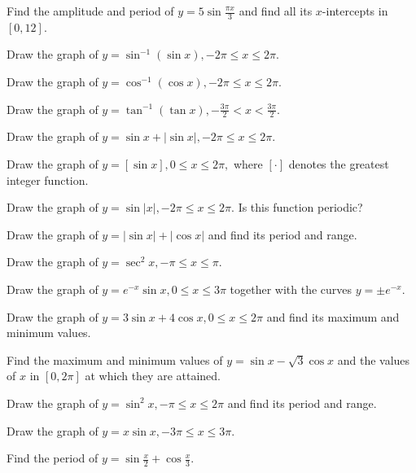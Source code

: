 \item Find the amplitude and period of $y = 5\sin\frac{\pi x}{3}$ and find all its $x$-intercepts in $[0, 12].$

\item Draw the graph of $y = \sin^{-1}(\sin x), -2\pi\leq x\leq 2\pi.$

\item Draw the graph of $y = \cos^{-1}(\cos x), -2\pi\leq x\leq 2\pi.$

\item Draw the graph of $y = \tan^{-1}(\tan x), -\frac{3\pi}{2} < x < \frac{3\pi}{2}.$

\item Draw the graph of $y = \sin x + |\sin x|, -2\pi\leq x\leq 2\pi.$

\item Draw the graph of $y = [\sin x], 0\leq x\leq 2\pi,$ where $[\cdot]$ denotes the greatest integer function.

\item Draw the graph of $y = \sin|x|, -2\pi\leq x\leq 2\pi.$ Is this function periodic?

\item Draw the graph of $y = |\sin x| + |\cos x|$ and find its period and range.

\item Draw the graph of $y = \sec^2x, -\pi\leq x\leq \pi.$

\item Draw the graph of $y = e^{-x}\sin x, 0\leq x\leq 3\pi$ together with the curves $y = \pm e^{-x}.$

\item Draw the graph of $y = 3\sin x + 4\cos x, 0\leq x\leq 2\pi$ and find its maximum and minimum values.

\item Find the maximum and minimum values of $y = \sin x - \sqrt{3}\cos x$ and the values of $x$ in $[0, 2\pi]$ at
    which they are attained.

\item Draw the graph of $y = \sin^2x, -\pi\leq x\leq 2\pi$ and find its period and range.

\item Draw the graph of $y = x\sin x, -3\pi\leq x\leq 3\pi.$

\item Find the period of $y = \sin\frac{x}{2} + \cos\frac{x}{3}.$

